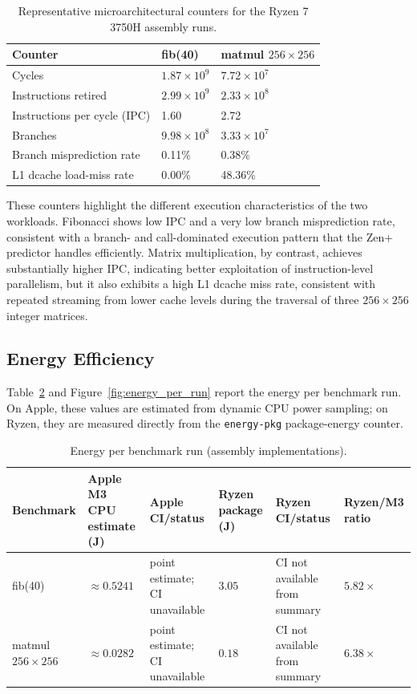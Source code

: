 \documentclass{tcsa}
\begin{document}
\begin{table}[!ht]
\centering
\caption{Representative microarchitectural counters for the Ryzen 7 3750H assembly runs.}
\label{tab:uarch}
\begin{tabularx}{\columnwidth}{lXX}
\toprule
Counter & fib(40) & matmul $256\times256$ \\
\midrule
Cycles                       & $1.87 \times 10^9$ & $7.72 \times 10^7$ \\
Instructions retired         & $2.99 \times 10^9$ & $2.33 \times 10^8$ \\
Instructions per cycle (IPC) & 1.60               & 2.72 \\
Branches                     & $9.98 \times 10^8$ & $3.33 \times 10^7$ \\
Branch misprediction rate    & 0.11\%             & 0.38\% \\
L1 dcache load-miss rate     & 0.00\%             & 48.36\% \\
\bottomrule
\end{tabularx}
\end{table}

These counters highlight the different execution characteristics of the
two workloads. Fibonacci shows low IPC and a very low branch
misprediction rate, consistent with a branch- and call-dominated
execution pattern that the Zen+ predictor handles efficiently. Matrix
multiplication, by contrast, achieves substantially higher IPC,
indicating better exploitation of instruction-level parallelism, but it
also exhibits a high L1 dcache miss rate, consistent with repeated
streaming from lower cache levels during the traversal of three
$256\times256$ integer matrices.

\subsection{Energy Efficiency}
\label{sec:energy_results}

Table~\ref{tab:energy} and Figure~\ref{fig:energy_per_run} report the
energy per benchmark run. On Apple, these values are estimated from
dynamic CPU power sampling; on Ryzen, they are measured directly from
the \texttt{energy-pkg} package-energy counter.

\begin{table}[!ht]
\centering
\small
\caption{Energy per benchmark run (assembly implementations).}
\label{tab:energy}
\begin{tabularx}{\textwidth}{lXXXXX}
\toprule
Benchmark & Apple M3 CPU estimate (J) & Apple CI/status & Ryzen package (J) & Ryzen CI/status & Ryzen/M3 ratio \\
\midrule
fib(40)               & $\approx 0.5241$ & point estimate; CI unavailable & $3.05$ & CI not available from summary & $5.82\times$ \\
matmul $256\times256$ & $\approx 0.0282$ & point estimate; CI unavailable & $0.18$ & CI not available from summary & $6.38\times$ \\
\bottomrule
\end{tabularx}
\end{table}
\end{document}
